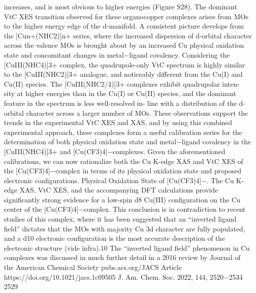 \documentclass{article}
\begin{document}
increases, and is most obvious to higher energies (Figure S28).
The dominant VtC XES transition observed for these
organocopper complexes arises from MOs to the higher
energy edge of the d-manifold. A consistent picture develops
from the [Cun+(NHC2)]n+ series, where the increased
dispersion of d-orbital character across the valence MOs is
brought about by an increased Cu physical oxidation state and
concomitant changes in metal−ligand covalency. Considering
the [CuIII(NHC4)]3+ complex, the quadrupole-only VtC
spectrum is highly similar to the [CuIII(NHC2)]3+ analogue,
and noticeably diﬀerent from the Cu(I) and Cu(II) species.
The [CuIII(NHC2/4)]3+ complexes exhibit quadrupolar inten-
sity at higher energies than in the Cu(I) or Cu(II) species, and
the dominant feature in the spectrum is less well-resolvedin-
line with a distribution of the d-orbital character across a larger
number of MOs. These observations support the trends in the
experimental VtC XES and XAS, and by using this combined
experimental approach, these complexes form a useful
calibration series for the determination of both physical
oxidation state and metal−ligand covalency in the
[CuIII(NHC4)]3+ and [Cu(CF3)4]−complexes. Given the
aforementioned calibrations, we can now rationalize both the
Cu K-edge XAS and VtC XES of the [Cu(CF3)4]−complex in
terms of its physical oxidation state and proposed electronic
conﬁgurations.
Physical Oxidation State of [Cu(CF3)4]−. The Cu K-edge
XAS, VtC XES, and the accompanying DFT calculations
provide signiﬁcantly strong evidence for a low-spin d8 Cu(III)
conﬁguration on the Cu center of the [Cu(CF3)4]−complex.
This conclusion is in contradiction to recent studies of this
complex, where it has been suggested that an “inverted ligand
ﬁeld” dictates that the MOs with majority Cu 3d character are
fully populated, and a d10 electronic conﬁguration is the most
accurate description of the electronic structure (vide infra).10
The “inverted ligand ﬁeld” phenomenon in Cu complexes
was discussed in much further detail in a 2016 review by
Journal of the American Chemical Society
pubs.acs.org/JACS
Article
https://doi.org/10.1021/jacs.1c09505
J. Am. Chem. Soc. 2022, 144, 2520−2534
2529

\newpage

\end{document}
